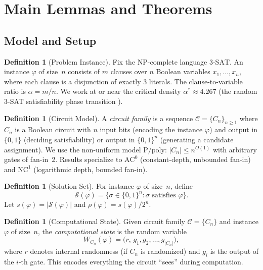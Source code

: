 \documentclass[11pt]{article}
\theoremstyle{definition}
\newtheorem{definition}[theorem]{Definition}
\theoremstyle{remark}
\newcommand{\calC}{\mathcal{C}}
\newcommand{\calS}{\mathcal{S}}
\newcommand{\Ppoly}{\mathrm{P/poly}}
\newcommand{\ACz}{\mathrm{AC}^0}
\newcommand{\NCone}{\mathrm{NC}^1}
\newcommand{\threeSAT}{\mathrm{3\text{-}SAT}}
\begin{document}
\section{Main Lemmas and Theorems}
\label{sec:lemmas}

\subsection{Model and Setup}

\begin{definition}[Problem Instance]
\label{def:instance}
Fix the NP-complete language $\threeSAT$.
An instance $\varphi$ of size~$n$ consists of $m$ clauses over $n$ Boolean
variables $x_1, \ldots, x_n$, where each clause is a disjunction of exactly
3 literals.  The clause-to-variable ratio is $\alpha = m/n$.  We work at or
near the critical density $\alpha^* \approx 4.267$ (the random 3-SAT
satisfiability phase transition \cite{DSS15}).
\end{definition}

\begin{definition}[Circuit Model]
\label{def:circuit}
A \emph{circuit family} is a sequence $\calC = \{C_n\}_{n \geq 1}$ where
$C_n$ is a Boolean circuit with $n$ input bits (encoding the instance
$\varphi$) and output in $\{0,1\}$ (deciding satisfiability) or output in
$\{0,1\}^n$ (generating a candidate assignment).  We use the non-uniform
model $\Ppoly$: $|C_n| \leq n^{O(1)}$ with arbitrary gates of fan-in~2.
Results specialize to $\ACz$ (constant-depth, unbounded fan-in) and $\NCone$
(logarithmic depth, bounded fan-in).
\end{definition}

\begin{definition}[Solution Set]
\label{def:solset}
For instance $\varphi$ of size~$n$, define
\[
  \calS(\varphi) = \bigl\{ \sigma \in \{0,1\}^n : \sigma \text{ satisfies } \varphi \bigr\}.
\]
Let $s(\varphi) = |\calS(\varphi)|$ and $\rho(\varphi) = s(\varphi)/2^n$.
\end{definition}

\begin{definition}[Computational State]
\label{def:compstate}
Given circuit family $\calC = \{C_n\}$ and instance $\varphi$ of size~$n$,
the \emph{computational state} is the random variable
\[
  W_{C_n}(\varphi) = \bigl(r,\, g_1, g_2, \ldots, g_{|C_n|}\bigr),
\]
where $r$ denotes internal randomness (if $C_n$ is randomized) and $g_i$
is the output of the $i$-th gate.  This encodes everything the circuit
``sees'' during computation.
\end{definition}
\end{document}

